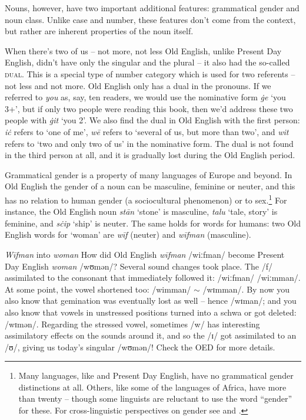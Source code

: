 \noindent Nouns, however, have two important additional features: grammatical gender and noun class. Unlike case and number, these features don't come from the context, but rather are inherent properties of the noun itself.


\begin{miscbox}{When there's two of us -- not more, not less}
Old English, unlike Present Day English, didn't have only the singular and the plural -- it also had the so-called \textsc{dual}. This is a special type of number category which is used for two referents -- not less and not more. Old English only has a dual in the pronouns. If we referred to \textit{you} as, say, ten readers, we would use the nominative form \textit{ġe} `you 3+', but if only two people were reading this book, then we'd address these two people with \textit{ġit} `you 2'. We also find the dual in Old English with the first person: \textit{iċ} refers to `one of me', \textit{wē} refers to `several of us, but more than two', and \textit{wit} refers to `two and only two of us' in the nominative form. The dual is not found in the third person at all, and it is gradually lost during the Old English period.
\end{miscbox}



\noindent Grammatical gender is a property of many languages of Europe and beyond. In Old English the gender of a noun can be masculine, feminine or neuter, and this has no relation to human gender (a sociocultural phenomenon) or to sex.\footnote{Many languages, like  and Present Day English, have no grammatical gender distinctions at all. Others, like some of the  languages of Africa, have more than twenty -- though some linguists are reluctant to use the word ``gender'' for these. For cross-linguistic perspectives on gender see \citet{Corbett1991} and \citet{Aikhenvald2016}.} For instance, the Old English noun \emph{stān} `stone' is masculine, \emph{talu} `tale, story' is feminine, and \emph{sċip} `ship' is neuter. The same holds for words for humans: two Old English words for `woman' are \emph{wīf} (neuter) and \emph{wīfman} (masculine).


\begin{soundbox}{\textit{Wīfman} into \textit{woman}}
How did Old English \textit{wīfman} /wiːfman/ become Present Day English \textit{woman} /wʊmən/? Several sound changes took place. The /f/ assimilated to the consonant that immediately followed it: /wiːfman/ \leftrightarrow /wiːmman/. At some point, the vowel shortened too: /wimman/ $\sim$ /wɪmman/. By now you also know that gemination was eventually lost as well -- hence /wɪman/; and you also know that vowels in unstressed positions turned into a schwa or got deleted: /wɪmən/. Regarding the stressed vowel, sometimes /w/ has interesting assimilatory effects on the sounds around it, and so the /ɪ/ got assimilated to an /ʊ/, giving us today's singular /wʊmən/! Check the OED for more details.
\end{soundbox}


